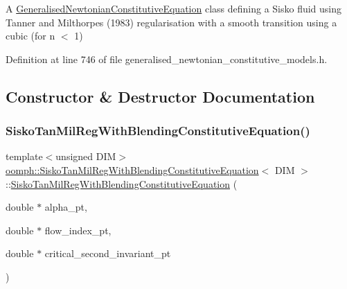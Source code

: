 A \hyperlink{classoomph_1_1GeneralisedNewtonianConstitutiveEquation}{Generalised\+Newtonian\+Constitutive\+Equation} class defining a Sisko fluid using Tanner and Milthorpe\textquotesingle{}s (1983) regularisation with a smooth transition using a cubic (for n $<$ 1) 

Definition at line 746 of file generalised\+\_\+newtonian\+\_\+constitutive\+\_\+models.\+h.



\subsection{Constructor \& Destructor Documentation}
\mbox{\label{classoomph_1_1SiskoTanMilRegWithBlendingConstitutiveEquation_a284ae14a748f8650c68f6e6b6bb8b742}} 
\subsubsection{\texorpdfstring{Sisko\+Tan\+Mil\+Reg\+With\+Blending\+Constitutive\+Equation()}{SiskoTanMilRegWithBlendingConstitutiveEquation()}}
{\footnotesize\ttfamily template$<$unsigned D\+IM$>$ \\
\hyperlink{classoomph_1_1SiskoTanMilRegWithBlendingConstitutiveEquation}{oomph\+::\+Sisko\+Tan\+Mil\+Reg\+With\+Blending\+Constitutive\+Equation}$<$ D\+IM $>$\+::\hyperlink{classoomph_1_1SiskoTanMilRegWithBlendingConstitutiveEquation}{Sisko\+Tan\+Mil\+Reg\+With\+Blending\+Constitutive\+Equation} (\begin{DoxyParamCaption}\item[{double $\ast$}]{alpha\+\_\+pt,  }\item[{double $\ast$}]{flow\+\_\+index\+\_\+pt,  }\item[{double $\ast$}]{critical\+\_\+second\+\_\+invariant\+\_\+pt }\end{DoxyParamCaption})\hspace{0.3cm}{\ttfamily [inline]}}



